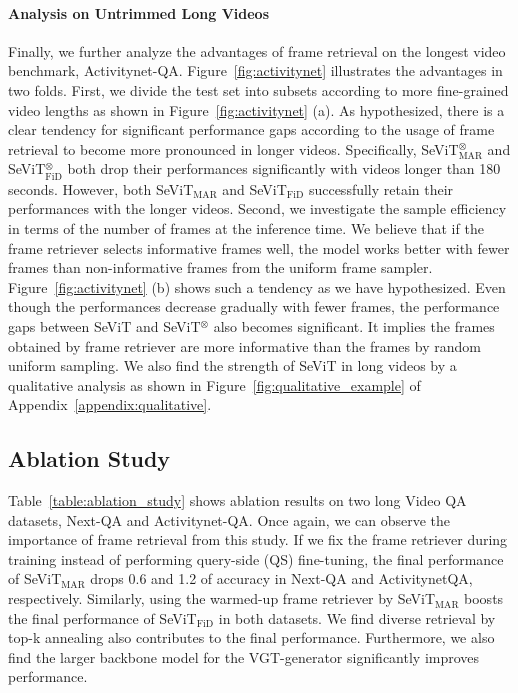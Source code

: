 \documentclass{article}
\newcommand{\frameworkname}{SeViT}
\begin{document}
\paragraph{Analysis on Untrimmed Long Videos}

Finally, we further analyze the advantages of frame retrieval on the longest video benchmark, Activitynet-QA. Figure~\ref{fig:activitynet} illustrates the advantages in two folds. First, we divide the test set into subsets according to more fine-grained video lengths as shown in Figure~\ref{fig:activitynet} (a). As hypothesized, there is a clear tendency for significant performance gaps according to the usage of frame retrieval to become more pronounced in longer videos. Specifically, \frameworkname{}$^{\otimes}_\text{MAR}$ and \frameworkname{}$^{\otimes}_\text{FiD}$ both drop their performances significantly with videos longer than 180 seconds. However, both \frameworkname{}$_\text{MAR}$ and \frameworkname{}$_\text{FiD}$ successfully retain their performances with the longer videos. Second, we investigate the sample efficiency in terms of the number of frames at the inference time. We believe that if the frame retriever selects informative frames well, the model works better with fewer frames than non-informative frames from the uniform frame sampler. Figure~\ref{fig:activitynet} (b) shows such a tendency as we have hypothesized. Even though the performances decrease gradually with fewer frames, the performance gaps between \frameworkname{} and \frameworkname{}$^{\otimes}$ also becomes significant. It implies the frames obtained by frame retriever are more informative than the frames by random uniform sampling. We also find the strength of \frameworkname{} in long videos by a qualitative analysis as shown in Figure~\ref{fig:qualitative_example} of Appendix~\ref{appendix:qualitative}.


\subsection{Ablation Study}


Table~\ref{table:ablation_study} shows ablation results on two long Video QA datasets, Next-QA and Activitynet-QA. Once again, we can observe the importance of frame retrieval from this study. If we fix the frame retriever during training instead of performing query-side (QS) fine-tuning, the final performance of \frameworkname{}$_\text{MAR}$ drops 0.6 and 1.2 of accuracy in Next-QA and ActivitynetQA, respectively. Similarly, using the warmed-up frame retriever by \frameworkname{}$_\text{MAR}$ boosts the final performance of \frameworkname{}$_\text{FiD}$  in both datasets. We find diverse retrieval by top-k annealing also contributes to the final performance. Furthermore, we also find the larger backbone model for the VGT-generator significantly improves performance.
\end{document}
